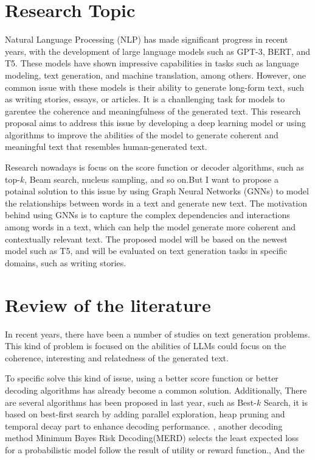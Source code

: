 \documentclass[10pt]{article}
\begin{document}
\begin{multicols}{2}
\section{Research Topic}
Natural Language Processing (NLP) has made significant progress in recent years, with the development of large language models such as GPT-3, BERT, and T5. These models have shown impressive capabilities in tasks such as language modeling, text generation, and machine translation, among others. However, one common issue with these models is their ability to generate long-form text, such as writing stories, essays, or articles. It is a chanllenging task for models to garentee the coherence and meaningfulness of the generated text. This research proposal aims to address this issue by developing a deep learning model or using algorithms to improve the abilities of the model to generate coherent and meaningful text that resembles human-generated text.

Research nowadays is focus on the score function or decoder algorithms, such as top-$k$, Beam search, nucleus sampling, and so on.But I want to propose a potainal solution to this issue by using Graph Neural Networks (GNNs) to model the relationships between words in a text and generate new text. The motivation behind using GNNs is to capture the complex dependencies and interactions among words in a text, which can help the model generate more coherent and contextually relevant text. The proposed model will be based on the newest model such as T5, and will be evaluated on text generation tasks in specific domains, such as writing stories.


\section{Review of the literature}

In recent years, there have been a number of studies on text generation problems. This kind of problem is focused on the abilities of LLMs could focus on the coherence, interesting and relatedness of the generated text. 

To specific solve this kind of issue, using a better score function or better decoding algorithms has already become a common solution\cite{amini-etal-2023-generating}.
Additionally, There are several algorithms has been proposed in last year, such as Best-$k$ Search, it is based on best-first search by adding parallel exploration, heap pruning and temporal decay part to enhance decoding performance. \cite{xu-etal-2023-best}, another decoding method Minimum Bayes Risk Decoding(MERD) selects the least expected loss for a probabilistic model follow the result of utility or reward function.\cite{suzgun-etal-2023-follow}, And the 


\end{multicols}
\end{document}
